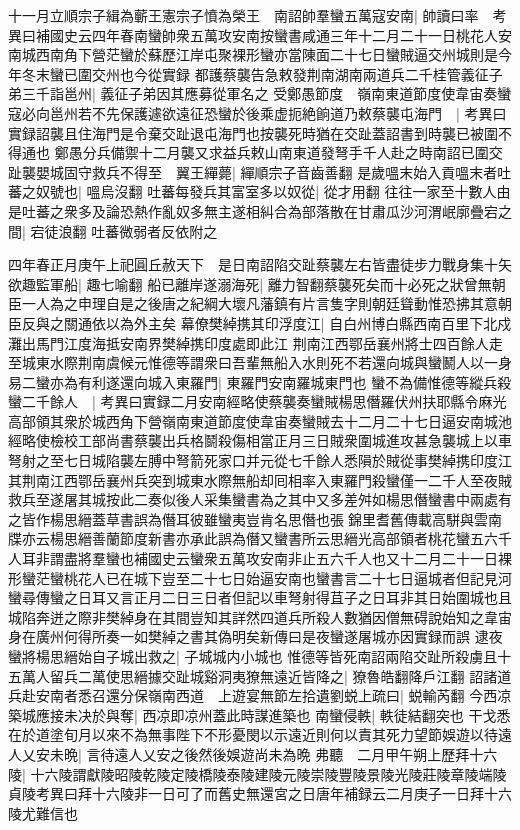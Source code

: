 十一月立順宗子緝為蘄王憲宗子憤為榮王　南詔帥羣蠻五萬寇安南|{
	帥讀曰率　考異曰補國史云四年春南蠻帥衆五萬攻安南按蠻書咸通三年十二月二十一日桃花人安南城西南角下營茫蠻於蘇歷江岸屯聚裸形蠻亦當陳面二十七日蠻賊逼交州城則是今年冬末蠻已圍交州也今從實録}
都護蔡襲告急敕發荆南湖南兩道兵二千桂管義征子弟三千詣邕州|{
	義征子弟因其應募從軍名之}
受鄭愚節度　嶺南東道節度使韋宙奏蠻寇必向邕州若不先保護遽欲遠征恐蠻於後乘虚扼絶餉道乃敕蔡襲屯海門　|{
	考異曰實録詔襲且住海門是令棄交趾退屯海門也按襲死時猶在交趾蓋詔書到時襲已被圍不得通也}
鄭愚分兵備禦十二月襲又求益兵敕山南東道發弩手千人赴之時南詔已圍交趾襲嬰城固守救兵不得至　翼王繟薨|{
	繟順宗子音齒善翻}
是歲嗢末始入貢嗢末者吐蕃之奴號也|{
	嗢烏沒翻}
吐蕃每發兵其富室多以奴從|{
	從才用翻}
往往一家至十數人由是吐蕃之衆多及論恐熱作亂奴多無主遂相糾合為部落散在甘肅瓜沙河渭岷廓疊宕之間|{
	宕徒浪翻}
吐蕃微弱者反依附之

四年春正月庚午上祀圓丘赦天下　是日南詔陷交趾蔡襲左右皆盡徒步力戰身集十矢欲趣監軍船|{
	趣七喻翻}
船已離岸遂溺海死|{
	離力智翻蔡襲死矣而十必死之狀曾無朝臣一人為之申理自是之後唐之紀綱大壞凡藩鎮有片言隻字則朝廷聳動惟恐拂其意朝臣反與之關通依以為外主矣}
幕僚樊綽携其印浮度江|{
	自白州博白縣西南百里下北戍灘出馬門江度海抵安南界樊綽携印度處即此江}
荆南江西鄂岳襄州將士四百餘人走至城東水際荆南虞候元惟德等謂衆曰吾輩無船入水則死不若還向城與蠻鬭人以一身易二蠻亦為有利遂還向城入東羅門|{
	東羅門安南羅城東門也}
蠻不為備惟德等縱兵殺蠻二千餘人　|{
	考異曰實録二月安南經略使蔡襲奏蠻賊楊思僭羅伏州扶耶縣令麻光高部領其衆於城西角下營嶺南東道節度使韋宙奏蠻賊去十二月二十七日逼安南城池經略使檢校工部尚書蔡襲出兵格鬬殺傷相當正月三日賊衆圍城進攻甚急襲城上以車弩射之至七日城陷襲左膊中弩箭死家口并元從七千餘人悉隕於賊從事樊綽携印度江其荆南江西鄂岳襄州兵突到城東水際無船却囘相率入東羅門殺蠻僅一二千人至夜賊救兵至遂屠其城按此二奏似後人采集蠻書為之其中又多差舛如楊思僭蠻書中兩處有之皆作楊思縉蓋草書誤為僭耳彼雖蠻夷豈肯名思僭也張錦里耆舊傳載高駢與雲南牒亦云楊思縉善蘭節度新書亦承此誤為僭又蠻書所云思縉光高部領者桃花蠻五六千人耳非謂盡將羣蠻也補國史云蠻衆五萬攻安南非止五六千人也又十二月二十一日裸形蠻茫蠻桃花人已在城下豈至二十七日始逼安南也蠻書言二十七日逼城者但記見河蠻尋傳蠻之日耳又言正月二日三日者但記以車弩射得苴子之日耳非其日始圍城也且城陷奔迸之際非樊綽身在其間豈知其詳然四道兵所殺人數猶因僧無碍說始知之韋宙身在廣州何得所奏一如樊綽之書其偽明矣新傳曰是夜蠻遂屠城亦因實録而誤}
逮夜蠻將楊思縉始自子城出救之|{
	子城城内小城也}
惟德等皆死南詔兩陷交趾所殺虜且十五萬人留兵二萬使思縉據交趾城谿洞夷獠無遠近皆降之|{
	獠魯皓翻降戶江翻}
詔諸道兵赴安南者悉召還分保嶺南西道　上遊宴無節左拾遺劉蜕上疏曰|{
	蜕輸芮翻}
今西凉築城應接未决於與奪|{
	西凉即凉州蓋此時謀進築也}
南蠻侵軼|{
	軼徒結翻突也}
干戈悉在於道塗旬月以來不為無事陛下不形憂閔以示遠近則何以責其死力望節娛遊以待遠人乂安未晩|{
	言待遠人乂安之後然後娛遊尚未為晩}
弗聽　二月甲午朔上歷拜十六陵|{
	十六陵謂獻陵昭陵乾陵定陵橋陵泰陵建陵元陵崇陵豐陵景陵光陵莊陵章陵端陵貞陵考異曰拜十六陵非一日可了而舊史無還宮之日唐年補録云二月庚子一日拜十六陵尤難信也}


